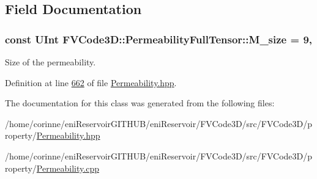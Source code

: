 \subsection{Field Documentation}
\subsubsection[{\texorpdfstring{M\+\_\+size}{M_size}}]{\setlength{\rightskip}{0pt plus 5cm}const {\bf U\+Int} F\+V\+Code3\+D\+::\+Permeability\+Full\+Tensor\+::\+M\+\_\+size = 9\hspace{0.3cm}{\ttfamily [static]}, {\ttfamily [private]}}\hypertarget{classFVCode3D_1_1PermeabilityFullTensor_aeced3092b19e53f95a72bdfa6d067518}{}\label{classFVCode3D_1_1PermeabilityFullTensor_aeced3092b19e53f95a72bdfa6d067518}


Size of the permeability. 



Definition at line \hyperlink{Permeability_8hpp_source_l00662}{662} of file \hyperlink{Permeability_8hpp_source}{Permeability.\+hpp}.



The documentation for this class was generated from the following files\+:\begin{DoxyCompactItemize}
\item 
/home/corinne/eni\+Reservoir\+G\+I\+T\+H\+U\+B/eni\+Reservoir/\+F\+V\+Code3\+D/src/\+F\+V\+Code3\+D/property/\hyperlink{Permeability_8hpp}{Permeability.\+hpp}\item 
/home/corinne/eni\+Reservoir\+G\+I\+T\+H\+U\+B/eni\+Reservoir/\+F\+V\+Code3\+D/src/\+F\+V\+Code3\+D/property/\hyperlink{Permeability_8cpp}{Permeability.\+cpp}\end{DoxyCompactItemize}
